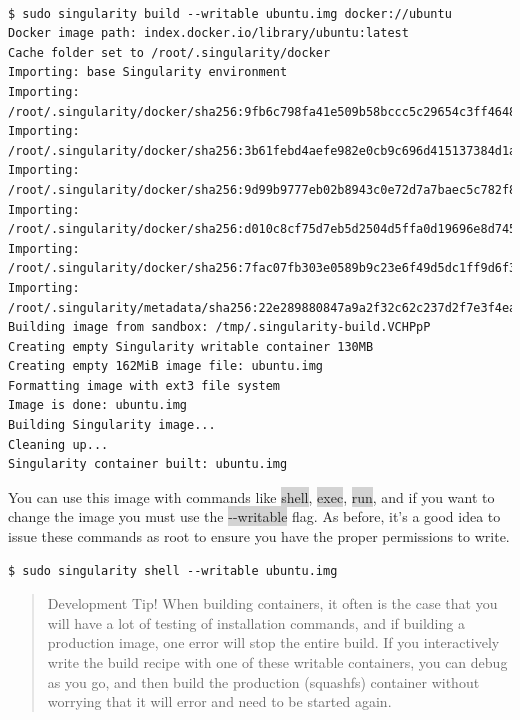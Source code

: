 \documentclass[a4paper]{article}
\begin{document}
\begin{lstlisting}[frame=single]  

$ sudo singularity build --writable ubuntu.img docker://ubuntu
Docker image path: index.docker.io/library/ubuntu:latest
Cache folder set to /root/.singularity/docker
Importing: base Singularity environment
Importing: /root/.singularity/docker/sha256:9fb6c798fa41e509b58bccc5c29654c3ff4648b608f5daa67c1aab6a7d02c118.tar.gz
Importing: /root/.singularity/docker/sha256:3b61febd4aefe982e0cb9c696d415137384d1a01052b50a85aae46439e15e49a.tar.gz
Importing: /root/.singularity/docker/sha256:9d99b9777eb02b8943c0e72d7a7baec5c782f8fd976825c9d3fb48b3101aacc2.tar.gz
Importing: /root/.singularity/docker/sha256:d010c8cf75d7eb5d2504d5ffa0d19696e8d745a457dd8d28ec6dd41d3763617e.tar.gz
Importing: /root/.singularity/docker/sha256:7fac07fb303e0589b9c23e6f49d5dc1ff9d6f3c8c88cabe768b430bdb47f03a9.tar.gz
Importing: /root/.singularity/metadata/sha256:22e289880847a9a2f32c62c237d2f7e3f4eae7259bf1d5c7ec7ffa19c1a483c8.tar.gz
Building image from sandbox: /tmp/.singularity-build.VCHPpP
Creating empty Singularity writable container 130MB
Creating empty 162MiB image file: ubuntu.img
Formatting image with ext3 file system
Image is done: ubuntu.img
Building Singularity image...
Cleaning up...
Singularity container built: ubuntu.img

\end{lstlisting}

You can use this image with commands like \colorbox{lightgray}{shell}, \colorbox{lightgray}{exec}, \colorbox{lightgray}{run}, and if you want to change the image you must use the \colorbox{lightgray}{-{}-writable} flag. As before, it’s a good idea to issue these commands as root to ensure you have the proper permissions to write.

\begin{lstlisting}[frame=single]
$ sudo singularity shell --writable ubuntu.img  
\end{lstlisting}
	
\begin{quote}
Development Tip! When building containers, it often is the case that you will have a lot of testing of installation commands, and if building a production image, one error will stop the entire build. If you interactively write the build recipe with one of these writable containers, you can debug as you go, and then build the production (squashfs) container without worrying that it will error and need to be started again.
\end{quote}		
		
\end{document}
